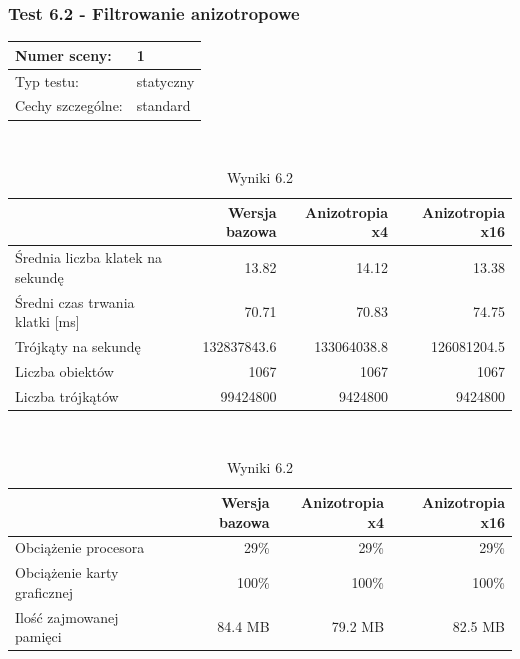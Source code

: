 \documentclass[a4paper,twoside,12pt]{book}
\begin{document}
\subsubsection{Test 6.2 - Filtrowanie anizotropowe}
\begin{tabular}{|l||l|}
\hline
Numer sceny: & 1 \\
\hline
Typ testu: & statyczny \\
\hline
Cechy szczególne: & standard \\
\hline
\end{tabular}\\

\begin{table}[H]
    \centering
    \caption{Wyniki 6.2}
    \label{tab:ni_test2}
    \begin{tabular}{|l||r|r|r|}
        \hline
        & Wersja bazowa & Anizotropia x4 & Anizotropia x16 \\
        \hline
        Średnia liczba klatek na sekundę & 13.82 & 14.12 & 13.38 \\
        \hline
        Średni czas trwania klatki [ms] & 70.71 & 70.83 & 74.75 \\
        \hline
        Trójkąty na sekundę & 132837843.6 & 133064038.8 & 126081204.5 \\
        \hline
        Liczba obiektów & 1067 & 1067 & 1067 \\
        \hline
        Liczba trójkątów & 99424800 & 9424800 & 9424800 \\
        \hline
    \end{tabular} \\
    
    \vspace*{0.5 cm}
    
    \begin{tabular}{|l||r|r|r|}
         \hline
        & Wersja bazowa & Anizotropia x4 & Anizotropia x16 \\
        \hline
        Obciążenie procesora & 29\% & 29\% & 29\% \\
        \hline
        Obciążenie karty graficznej & 100\% & 100\% & 100\% \\
        \hline
        Ilość zajmowanej pamięci & 84.4 MB & 79.2 MB & 82.5 MB \\
        \hline
    \end{tabular}
\end{table}
\end{document}
